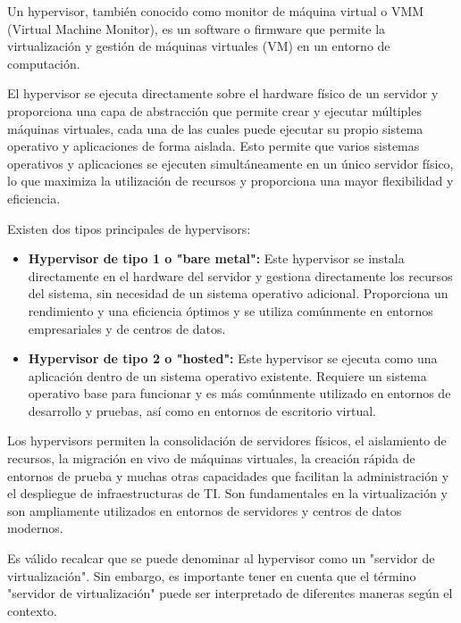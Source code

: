 			Un hypervisor, también conocido como monitor de máquina virtual o VMM (Virtual Machine Monitor), es un software o firmware que permite la virtualización y gestión de máquinas virtuales (VM) en un entorno de computación.\par
			
			El hypervisor se ejecuta directamente sobre el hardware físico de un servidor y proporciona una capa de abstracción que permite crear y ejecutar múltiples máquinas virtuales, cada una de las cuales puede ejecutar su propio sistema operativo y aplicaciones de forma aislada. Esto permite que varios sistemas operativos y aplicaciones se ejecuten simultáneamente en un único servidor físico, lo que maximiza la utilización de recursos y proporciona una mayor flexibilidad y eficiencia.\par
	
			Existen dos tipos principales de hypervisors:
			
			\begin{itemize}
			
			\item\textbf{Hypervisor de tipo 1 o "bare metal":} Este hypervisor se instala directamente en el hardware del servidor y gestiona directamente los recursos del sistema, sin necesidad de un sistema operativo adicional. Proporciona un rendimiento y una eficiencia óptimos y se utiliza comúnmente en entornos empresariales y de centros de datos.
			
			\item\textbf{Hypervisor de tipo 2 o "hosted":} Este hypervisor se ejecuta como una aplicación dentro de un sistema operativo existente. Requiere un sistema operativo base para funcionar y es más comúnmente utilizado en entornos de desarrollo y pruebas, así como en entornos de escritorio virtual.

			\end{itemize}
			
			Los hypervisors permiten la consolidación de servidores físicos, el aislamiento de recursos, la migración en vivo de máquinas virtuales, la creación rápida de entornos de prueba y muchas otras capacidades que facilitan la administración y el despliegue de infraestructuras de TI. Son fundamentales en la virtualización y son ampliamente utilizados en entornos de servidores y centros de datos modernos.\par
			
			Es válido recalcar que se puede denominar al hypervisor como un "servidor de virtualización". Sin embargo, es importante tener en cuenta que el término "servidor de virtualización" puede ser interpretado de diferentes maneras según el contexto.\par
			
